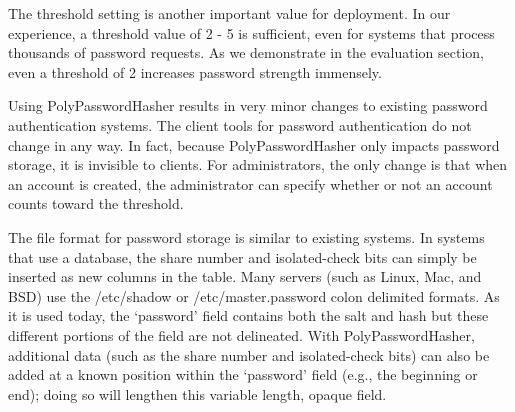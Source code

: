 The threshold setting is another important value for deployment.  In our
experience, a threshold value of 2 - 5 is sufficient, even for systems that
process thousands of password requests.  As we demonstrate in the evaluation
section, even a threshold of 2 increases password strength immensely.

Using PolyPasswordHasher results in very minor changes to existing password
authentication systems. The client tools for password authentication do not
change in any way. In fact, because PolyPasswordHasher only impacts password
storage, it is invisible to clients. For administrators, the only change is
that when an account is created, the administrator can specify whether or not
an account counts toward the threshold.

The file format for password storage is similar to existing systems. In systems
that use a database, the share number and isolated-check bits can simply be
inserted as new columns in the table.  Many servers (such as Linux, Mac, and
BSD) use the /etc/shadow or /etc/master.password colon delimited formats.  As
it is used today, the ‘password’ field contains both the salt and hash but
these different portions of the field are not delineated.  With
PolyPasswordHasher, additional data (such as the share number and
isolated-check bits) can also be added at a known position within the
‘password’ field (e.g., the beginning or end); doing so will lengthen this
variable length, opaque field.


